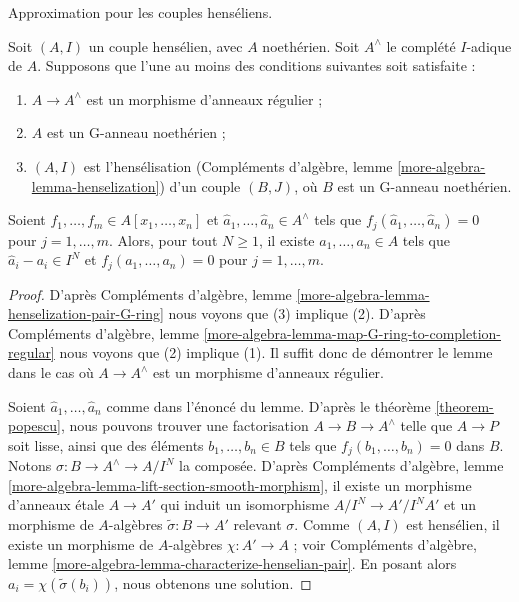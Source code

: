 \begin{lemma}
\label{lemma-henselian-pair}
\begin{slogan}
Approximation pour les couples henséliens.
\end{slogan}
Soit $(A, I)$ un couple hensélien, avec $A$ noethérien.
Soit $A^\wedge$ le complété $I$-adique de $A$. Supposons que l'une au
moins des conditions suivantes soit satisfaite :
\begin{enumerate}
\item $A \to A^\wedge$ est un morphisme d'anneaux régulier ;
\item $A$ est un G-anneau noethérien ;
\item $(A, I)$ est l'hensélisation
(Compléments d'algèbre, lemme \ref{more-algebra-lemma-henselization})
d'un couple $(B, J)$, où $B$ est un G-anneau noethérien.
\end{enumerate}
Soient $f_1, \ldots, f_m \in A[x_1, \ldots, x_n]$
et $\hat{a}_1, \ldots, \hat{a}_n \in A^\wedge$ tels que
$f_j(\hat{a}_1, \ldots, \hat{a}_n) = 0$
pour $j = 1, \ldots, m$. Alors, pour tout $N \geq 1$, il existe
$a_1, \ldots, a_n \in A$ tels que
$\hat{a}_i - a_i \in I^N$ et $f_j(a_1, \ldots, a_n) = 0$
pour $j = 1, \ldots, m$.
\end{lemma}

\begin{proof}
D'après Compléments d'algèbre, lemme
\ref{more-algebra-lemma-henselization-pair-G-ring}
nous voyons que (3) implique (2). D'après Compléments d'algèbre, lemme
\ref{more-algebra-lemma-map-G-ring-to-completion-regular}
nous voyons que (2) implique (1). Il suffit donc de démontrer le lemme
dans le cas où $A \to A^\wedge$ est un morphisme d'anneaux régulier.

\medskip\noindent
Soient $\hat{a}_1, \ldots, \hat{a}_n$ comme dans l'énoncé du lemme.
D'après le théorème \ref{theorem-popescu}, nous pouvons trouver une
factorisation $A \to B \to A^\wedge$ telle que $A \to P$ soit lisse, ainsi que
des éléments $b_1, \ldots, b_n \in B$ tels que
$f_j(b_1, \ldots, b_n) = 0$ dans $B$.
Notons $\sigma : B \to A^\wedge \to A/I^N$ la composée.
D'après Compléments d'algèbre, lemme
\ref{more-algebra-lemma-lift-section-smooth-morphism}, il existe un morphisme
d'anneaux \'etale $A \to A'$ qui induit un isomorphisme
$A/I^N \to A'/I^NA'$ et un morphisme de $A$-algèbres
$\tilde \sigma : B \to A'$ relevant $\sigma$.
Comme $(A, I)$ est hensélien, il existe un morphisme de $A$-algèbres
$\chi : A' \to A$ ; voir Compléments d'algèbre, lemme
\ref{more-algebra-lemma-characterize-henselian-pair}.
En posant alors $a_i = \chi(\tilde \sigma(b_i))$, nous obtenons une solution.
\end{proof}









